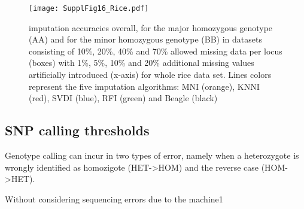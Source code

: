 \begin{figure}\texttt{[image: SupplFig16\_Rice.pdf]}\caption{
imputation accuracies overall, for the major homozygous genotype (AA) and for the minor homozygous genotype (BB) in datasets consisting of
10\%, 20\%, 40\% and 70\% allowed missing data per locus (boxes) with 1\%, 5\%, 10\% and 20\%
additional missing values artificially introduced (x-axis) for whole rice data set.
Lines colors represent the five imputation algorithms: MNI
(orange), KNNI (red), SVDI (blue), RFI (green) and Beagle (black)}\end{figure}

\subsection{SNP calling thresholds}
\label{sec:SNP_calling_thresholds}
Genotype calling can incur in two types of error, namely when a heterozygote is wrongly identified as homozigote (HET->HOM) and the reverse case (HOM->HET). 

Without considering sequencing errors due to the machine1




